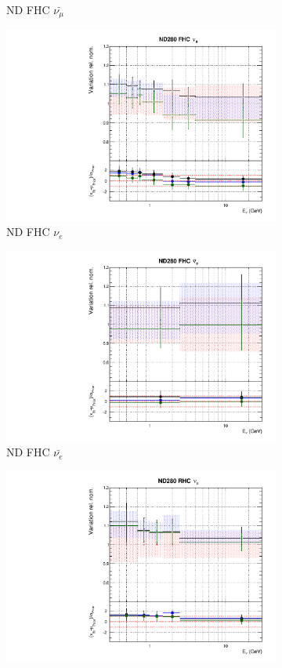 \begin{figure}
\begin{subfigure}{0.24\textwidth}
  \caption{ND FHC $\bar{\nu_{\mu}}$}
\end{subfigure}
\begin{subfigure}{0.24\textwidth}
  \centering
  \includegraphics[width=0.95\linewidth]{figs/fhcrhcfitsflux_2}
  \caption{ND FHC $\nu_e$}
\end{subfigure}
\begin{subfigure}{0.24\textwidth}
  \centering
  \includegraphics[width=0.95\linewidth]{figs/fhcrhcfitsflux_3}
  \caption{ND FHC $\bar{\nu_{e}}$}
\end{subfigure}
\begin{subfigure}{0.24\textwidth}
  \centering
  \includegraphics[width=0.95\linewidth]{figs/fhcrhcfitsflux_4}

\end{subfigure}
\end{figure}
